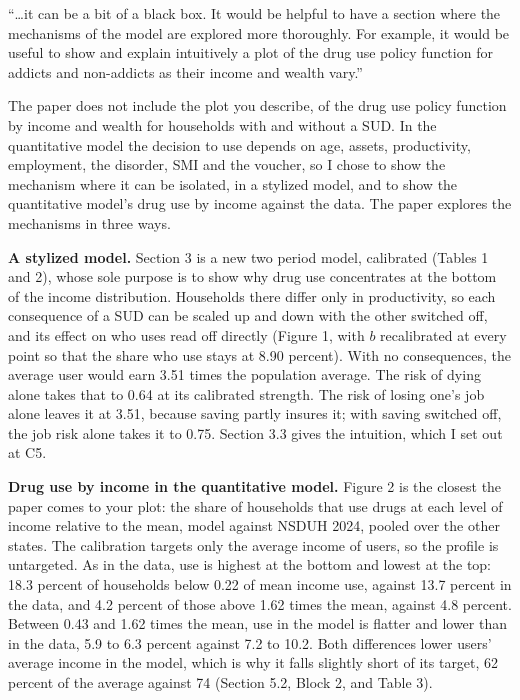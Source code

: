 \documentclass[11pt]{article}
\begin{document}
\begin{referee}
``\dots it can be a bit of a black box. It would be helpful to have a section
where the mechanisms of the model are explored more thoroughly. For example, it
would be useful to show and explain intuitively a plot of the drug use policy
function for addicts and non-addicts as their income and wealth vary.''
\end{referee}
\begin{response}
\open The paper does not include the plot you describe, of the drug use policy function
by income and wealth for households with and without a SUD. In the quantitative model the
decision to use depends on age, assets, productivity, employment, the disorder, SMI and
the voucher, so I chose to show the mechanism where it can be isolated, in a stylized
model, and to show the quantitative model's drug use by income against the data. The
paper explores the mechanisms in three ways.

\textbf{A stylized model.} Section 3 is a new two period model, calibrated (Tables 1 and
2), whose sole purpose is to show why drug use concentrates at the bottom of the income
distribution. Households there differ only in productivity, so each consequence of a SUD
can be scaled up and down with the other switched off, and its effect on who uses read off
directly (Figure 1, with $b$ recalibrated at every point so that the share who use stays at
8.90 percent). With no consequences, the average user would earn 3.51 times the population
average. The risk of dying alone takes that to 0.64 at its calibrated strength. The risk of
losing one's job alone leaves it at 3.51, because saving partly insures it; with saving
switched off, the job risk alone takes it to 0.75. Section 3.3 gives the intuition, which I
set out at C5.

\textbf{Drug use by income in the quantitative model.} Figure 2 is the closest the paper
comes to your plot: the share of households that use drugs at each level of income
relative to the mean, model against NSDUH 2024, pooled over the other states. The
calibration targets only the average income of users, so the profile is untargeted. As in
the data, use is highest at the bottom and lowest at the top: 18.3 percent of households
below 0.22 of mean income use, against 13.7 percent in the data, and 4.2 percent of those
above 1.62 times the mean, against 4.8 percent. Between 0.43 and 1.62 times the mean, use
in the model is flatter and lower than in the data, 5.9 to 6.3 percent against 7.2 to 10.2.
Both differences lower users' average income in the model, which is why it falls slightly
short of its target, 62 percent of the average against 74 (Section 5.2, Block 2, and Table
3).


\end{response}
\end{document}
